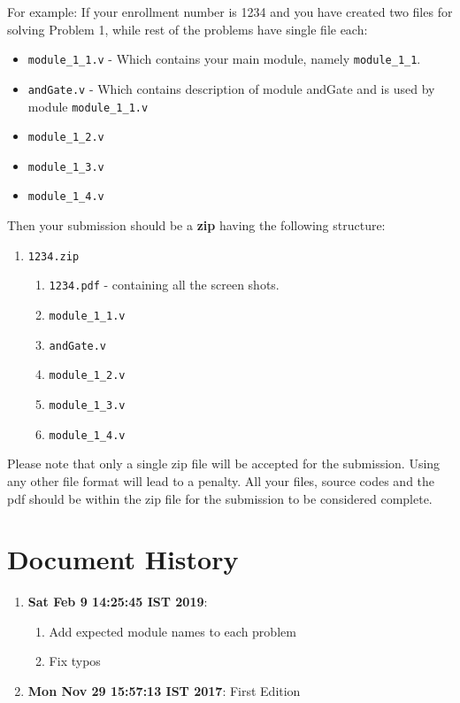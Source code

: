 \documentclass[a4paper,10pt]{article}
\theoremstyle{mytheor}
\newcommand{\histitem}[2]{
  \footnotesize
  \item \textbf{#1}: #2
  \normalsize
}
\begin{document}
{\color{blue}For example}: If your enrollment number is 1234 and you have created
two files for solving Problem 1, while rest of the problems have
single file each:

\begin{itemize}
\item \lstinline[style=verilog-inline-style]{module_1_1.v} - Which contains your main module, namely
  \lstinline[style=verilog-inline-style]{module_1_1}.
\item \lstinline[style=verilog-inline-style]{andGate.v} - Which contains description of module andGate and is
  used by module \lstinline[style=verilog-inline-style]{module_1_1.v}
\item \lstinline[style=verilog-inline-style]{module_1_2.v}
\item \lstinline[style=verilog-inline-style]{module_1_3.v}
\item \lstinline[style=verilog-inline-style]{module_1_4.v}
\end{itemize}

Then your submission should be a \textbf{\color{blue}zip} having the following structure:

\begin{enumerate}
\item \lstinline[style=verilog-inline-style]{1234.zip}
  \begin{enumerate}
  \item \lstinline[style=verilog-inline-style]{1234.pdf} - containing
    all the screen shots.
  \item \lstinline[style=verilog-inline-style]{module_1_1.v}
  \item \lstinline[style=verilog-inline-style]{andGate.v}
  \item \lstinline[style=verilog-inline-style]{module_1_2.v}
  \item \lstinline[style=verilog-inline-style]{module_1_3.v}
  \item \lstinline[style=verilog-inline-style]{module_1_4.v}
  \end{enumerate}
\end{enumerate}

Please note that only a single zip file will be accepted for the
submission. Using any other file format will lead to a
{\color{red}penalty}. All your files, source codes and the pdf should
be within the zip file for the submission to be considered complete.

\section*{Document History}
\begin{enumerate}
  \histitem{Sat Feb  9 14:25:45 IST 2019}{
    \begin{enumerate}
    \item Add expected module names to each problem
    \item Fix typos
    \end{enumerate}
  }
  \histitem{Mon Nov 29 15:57:13 IST 2017} {
    First Edition
  }
\end{enumerate}
\end{document}
